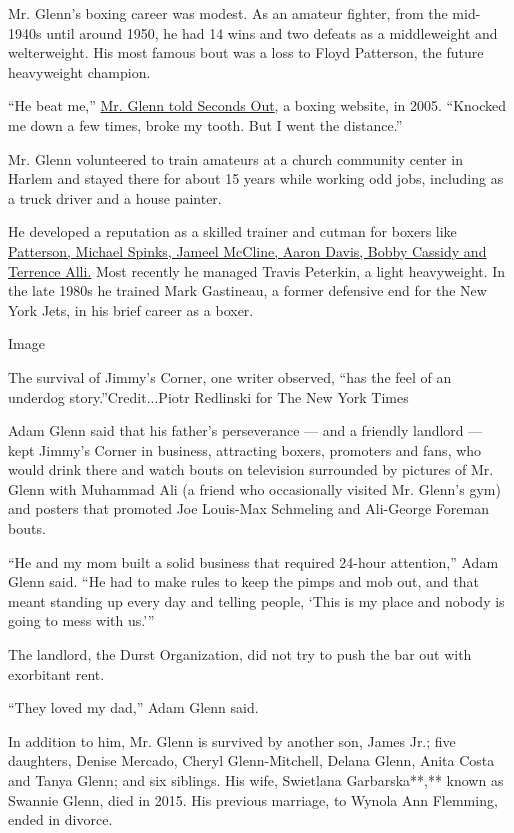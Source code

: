 Mr. Glenn's boxing career was modest. As an amateur fighter, from the
mid-1940s until around 1950, he had 14 wins and two defeats as a
middleweight and welterweight. His most famous bout was a loss to Floyd
Patterson, the future heavyweight champion.

``He beat me,''
\href{https://www.secondsout.com/columns/thomas-hauser/happy-birthday-jimmy-glenn}{Mr.
Glenn told Seconds Out}, a boxing website, in 2005. ``Knocked me down a
few times, broke my tooth. But I went the distance.''

Mr. Glenn volunteered to train amateurs at a church community center in
Harlem and stayed there for about 15 years while working odd jobs,
including as a truck driver and a house painter.

He developed a reputation as a skilled trainer and cutman for boxers
like \href{https://boxrec.com/media/index.php/Jimmy_Glenn}{Patterson,
Michael Spinks, Jameel McCline, Aaron Davis, Bobby Cassidy and Terrence
Alli.} Most recently he managed Travis Peterkin, a light heavyweight. In
the late 1980s he trained Mark Gastineau, a former defensive end for the
New York Jets, in his brief career as a boxer.

Image

The survival of Jimmy's Corner, one writer observed, ``has the feel of
an underdog story.''Credit...Piotr Redlinski for The New York Times

Adam Glenn said that his father's perseverance --- and a friendly
landlord --- kept Jimmy's Corner in business, attracting boxers,
promoters and fans, who would drink there and watch bouts on television
surrounded by pictures of Mr. Glenn with Muhammad Ali (a friend who
occasionally visited Mr. Glenn's gym) and posters that promoted Joe
Louis-Max Schmeling and Ali-George Foreman bouts.

``He and my mom built a solid business that required 24-hour
attention,'' Adam Glenn said. ``He had to make rules to keep the pimps
and mob out, and that meant standing up every day and telling people,
`This is my place and nobody is going to mess with us.'''

The landlord, the Durst Organization, did not try to push the bar out
with exorbitant rent.

``They loved my dad,'' Adam Glenn said.

In addition to him, Mr. Glenn is survived by another son, James Jr.;
five daughters, Denise Mercado, Cheryl Glenn-Mitchell, Delana Glenn,
Anita Costa and Tanya Glenn; and six siblings. His wife, Swietlana
Garbarska**,** known as Swannie Glenn, died in 2015. His previous
marriage, to Wynola Ann Flemming, ended in divorce.

